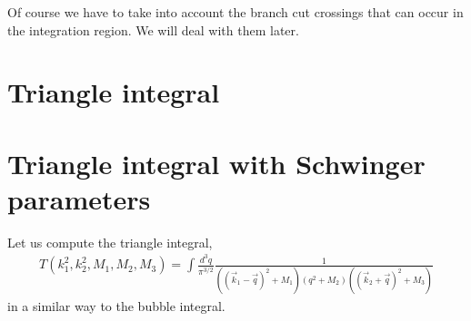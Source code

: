 \documentclass[twoside]{article}
\begin{document}
Of course we have to take into account the branch cut crossings that can occur in the integration region. We will deal with them later.

\section{Triangle integral}
\section{Triangle integral with Schwinger parameters}
Let us compute the triangle integral,
\begin{align}
  T(k^2_1, k^2_2, M_1, M_2, M_3) = \int \frac{d^3q}{\pi^{3/2}}\frac{1}{((\vec{k}_1 - \vec{q})^2 + M_1) (q^2 + M_2)( (\vec{k}_2 +
\vec{q})^2 + M_3)}
\end{align}
in a similar way to the bubble integral. 
\end{document}
